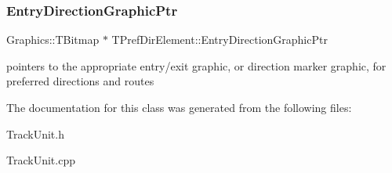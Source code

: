 \subsubsection{\texorpdfstring{Entry\+Direction\+Graphic\+Ptr}{EntryDirectionGraphicPtr}}
{\footnotesize\ttfamily Graphics\+::\+T\+Bitmap $\ast$ T\+Pref\+Dir\+Element\+::\+Entry\+Direction\+Graphic\+Ptr\hspace{0.3cm}{\ttfamily [protected]}}

pointers to the appropriate entry/exit graphic, or direction marker graphic, for preferred directions and routes 

The documentation for this class was generated from the following files\+:\begin{DoxyCompactItemize}
\item 
Track\+Unit.\+h\item 
Track\+Unit.\+cpp\end{DoxyCompactItemize}

